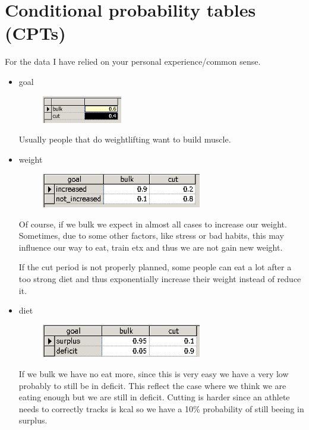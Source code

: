 \documentclass[11pt]{article}
\begin{document}
\section{Conditional probability tables (CPTs)}
For the data I have relied on your personal experience/common sense.
\begin{itemize}
\item goal
\begin{figure}[H]
\includegraphics[width=0.33\textwidth]{./images/nodes/definitions/1.png}
\end{figure}
Usually people that do weightlifting want to build muscle. 
\item weight
\begin{figure}[H]
\includegraphics[width=0.66\textwidth]{./images/nodes/definitions/2.png}
\end{figure}
Of course, if we bulk we expect in almost all cases to increase our weight. Sometimes, due to some other factors, like stress or bad habits, this may influence our way to eat, train etx and thus we are not gain new weight. 

If the cut period is not properly planned, some people can eat a lot after a too strong diet and thus exponentially increase their weight instead of reduce it.

\item diet
\begin{figure}[H]
\includegraphics[width=0.66\textwidth]{./images/nodes/definitions/3.png}
\end{figure}

If we bulk we have no eat more, since this is very easy  we have a very low probably to still be in deficit. This reflect the case where we think we are eating enough but we are still in deficit. Cutting is harder since an athlete needs to correctly tracks is kcal so we have a 10\% probability of still beeing in surplus.


\end{itemize}
\end{document}
